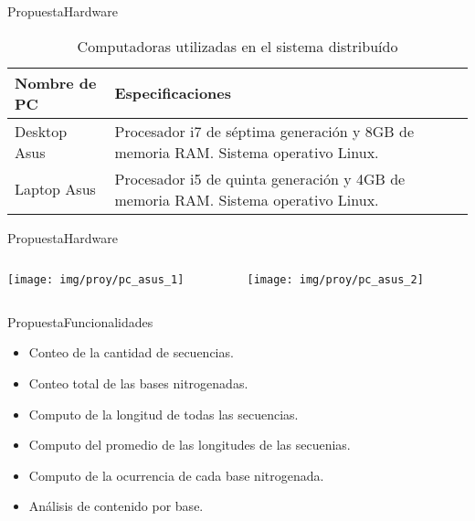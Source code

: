 \documentclass[10pt]{beamer}
\newcommand{\1}{
        	\setbeamertemplate{background}{
        		\texttt{[image: img/1]}
        		\tikz[overlay] \fill[fill opacity=0.75,fill=white] (0,0) rectangle (-\paperwidth,\paperheight);
        	}
}
\begin{document}
\begin{frame}{Propuesta}{Hardware}
\begin{table}[H]
	\centering
	\caption{Computadoras utilizadas en el sistema distribuído}
	\label{tab:pcs}
	\begin{tabular}{lp{6cm}}
		\textbf{Nombre de PC} & \textbf{Especificaciones}
		\\ \hline
		Desktop Asus      & Procesador i7 de séptima generación y 8GB de memoria RAM. Sistema operativo Linux.   \\
		Laptop Asus      & Procesador i5 de quinta generación y 4GB de memoria RAM. Sistema operativo Linux.\\
	\end{tabular}
\end{table}
\end{frame}

\begin{frame}{Propuesta}{Hardware}
	\begin{columns}
		\begin{column}{0.48\textwidth}
			\centering
			\texttt{[image: img/proy/pc\_asus\_1]}
		\end{column}
	\begin{column}{0.48\textwidth}
		\centering
		\texttt{[image: img/proy/pc\_asus\_2]}
	\end{column}
	\end{columns}
\end{frame}

\begin{frame}{Propuesta}{Funcionalidades}
	\begin{itemize}
		\item Conteo de la cantidad de secuencias. 
		\item Conteo total de las bases nitrogenadas. 
		\item Computo de la longitud de todas las secuencias. 
		\item Computo del promedio de las longitudes de las secuenias.
		\item Computo de la ocurrencia de cada base nitrogenada.
		\item Análisis de contenido por base.
	\end{itemize}
\end{frame}
\end{document}
